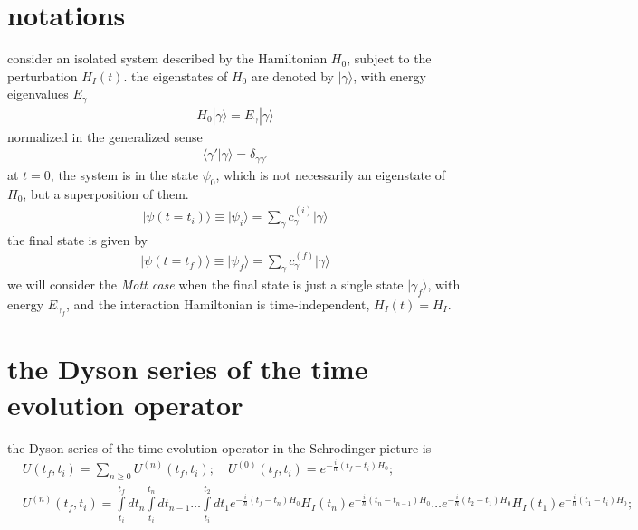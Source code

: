 
\newpage
\section{notations}

consider an isolated system described by the Hamiltonian $H_0$, subject to the perturbation $H_I(t)$.
the eigenstates of $H_0$ are denoted by $|\gamma\rangle$, with energy eigenvalues $E_\gamma$
\begin{align}
    H_0 |\gamma\rangle = E_\gamma|\gamma\rangle
\end{align}
normalized in the generalized sense
\begin{align}
    \langle \gamma'|\gamma\rangle=\delta_{\gamma\gamma'}
\end{align}
at $t = 0$, the system is in the state $\psi_0$, which is not necessarily an eigenstate of $H_0$, but a superposition of them.
\begin{align}
    |\psi(t=t_i)\rangle \equiv |\psi_i\rangle= \sum_\gamma c^{(i)}_\gamma|\gamma\rangle
\end{align}
the final state is given by
\begin{align}
    |\psi(t=t_f)\rangle \equiv |\psi_f\rangle =  \sum_\gamma c^{(f)}_\gamma|\gamma\rangle
\end{align}
we will consider the  {\it Mott case} when the final state is just a single state $|\gamma_f\rangle$, with energy $E_{\gamma_f}$, and the interaction Hamiltonian is time-independent, $H_I(t) = H_I$.
\newpage
\section{the Dyson series of the time evolution operator}\label{sect:general-tdpt}
the Dyson series of the time evolution operator in the Schrodinger picture is
\begin{align}
    & U(t_f,t_i) = \sum\limits_{n\ge0}U^{(n)}(t_f,t_i); \quad
    U^{(0)}(t_f,t_i) = e^{-\frac{i}{\hbar}(t_f-t_i)H_0};\nonumber                                                                                                                                                                                                                          \\
    & U^{(n)}(t_f,t_i)=\int\limits_{t_i}^{t_f}dt_n \int\limits_{t_i}^{t_{n}}dt_{n-1} \dots \int\limits_{t_i}^{t_{2}}dt_1 e^{-\frac{i}{\hbar}(t_f-t_n)H_0} H_I(t_n)e^{-\frac{i}{\hbar}(t_{n}-t_{n-1})H_0} \ldots e^{-\frac{i}{\hbar}(t_2-t_1)H_0}H_I(t_1)e^{-\frac{i}{\hbar}(t_1-t_i)H_0};
\end{align}
